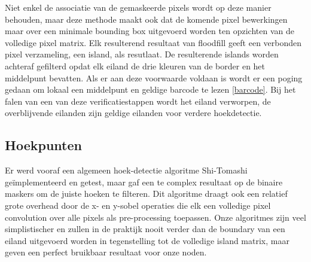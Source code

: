 Niet enkel de associatie van de gemaskeerde pixels wordt op deze manier behouden, maar deze methode maakt ook dat de komende pixel bewerkingen maar over een minimale bounding box uitgevoerd worden ten opzichten van de volledige pixel matrix. Elk resulterend resultaat van floodfill geeft een verbonden pixel verzameling, een island, als resutlaat. De resulterende islands worden achteraf gefilterd opdat elk eiland de drie kleuren van de border en het middelpunt bevatten. Als er aan deze voorwaarde voldaan is wordt er een poging gedaan om lokaal een middelpunt en geldige barcode te lezen \ref{barcode}. Bij het falen van een van deze verificatiestappen wordt het eiland verworpen, de overblijvende eilanden zijn geldige eilanden voor verdere hoekdetectie.

\subsection{Hoekpunten}
Er werd vooraf een algemeen hoek-detectie algoritme Shi-Tomashi \cite{shi-tomashi} geïmplementeerd en getest, maar gaf een te complex resultaat op de binaire maskers om de juiste hoeken te filteren. Dit algoritme draagt ook een relatief grote overhead door de x- en y-sobel operaties die elk een volledige pixel convolution over alle pixels als pre-processing toepassen. Onze algoritmes zijn veel simplistischer en zullen in de praktijk nooit verder dan de boundary van een eiland uitgevoerd worden in tegenstelling tot de volledige island matrix, maar geven een perfect bruikbaar resultaat voor onze noden.


